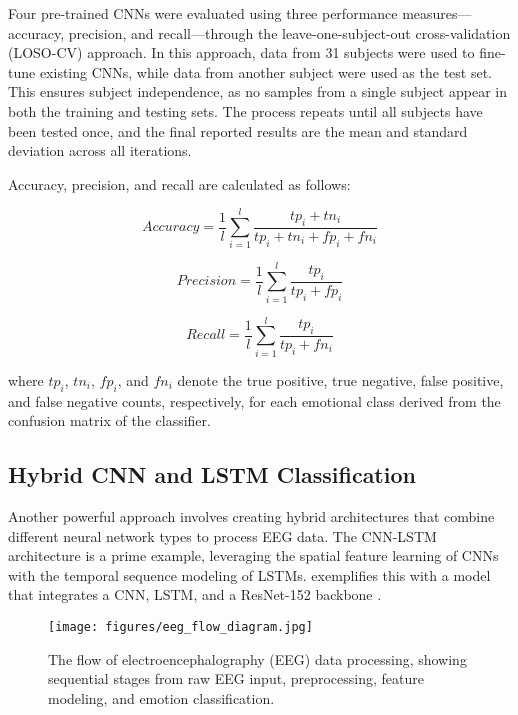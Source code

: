 \documentclass[conference]{IEEEtran}
\begin{document}
Four pre-trained CNNs were evaluated using three performance measures—accuracy, precision, and recall—through the leave-one-subject-out cross-validation (LOSO-CV) \cite{Pauli2021BalancedLOSO} approach. In this approach, data from 31 subjects were used to fine-tune existing CNNs, while data from another subject were used as the test set. This ensures subject independence, as no samples from a single subject appear in both the training and testing sets. The process repeats until all subjects have been tested once, and the final reported results are the mean and standard deviation across all iterations.

Accuracy, precision, and recall \cite{Powers2020EvaluationArXiv} are calculated as follows:

\begin{equation}
Accuracy = \frac{1}{l} \sum_{i=1}^{l} \frac{tp_i + tn_i}{tp_i + tn_i + fp_i + fn_i}
\end{equation}

\begin{equation}
Precision = \frac{1}{l} \sum_{i=1}^{l} \frac{tp_i}{tp_i + fp_i}
\end{equation}

\begin{equation}
Recall = \frac{1}{l} \sum_{i=1}^{l} \frac{tp_i}{tp_i + fn_i}
\end{equation}

where \(tp_i\), \(tn_i\), \(fp_i\), and \(fn_i\) denote the true positive, true negative, false positive, and false negative counts, respectively, for each emotional class derived from the confusion matrix of the classifier.


\subsection{Hybrid CNN and LSTM Classification}
Another powerful approach involves creating hybrid architectures that combine different neural network types to process EEG data. The CNN-LSTM architecture is a prime example, leveraging the spatial feature learning of CNNs with the temporal sequence modeling of LSTMs. \cite{Chakravarthi2022EEGHybridCNNLSTM} exemplifies this with a model that integrates a CNN, LSTM, and a ResNet-152 backbone \cite{Shanmugasundaram2024APLResNet152}.

\begin{figure}[H]
    \centering
    \texttt{[image: figures/eeg\_flow\_diagram.jpg]}
    \caption{The flow of electroencephalography (EEG) data processing, showing sequential stages from raw EEG input, preprocessing, feature modeling, and emotion classification.}
    \label{fig:eeg_flow}
\end{figure}
\end{document}
